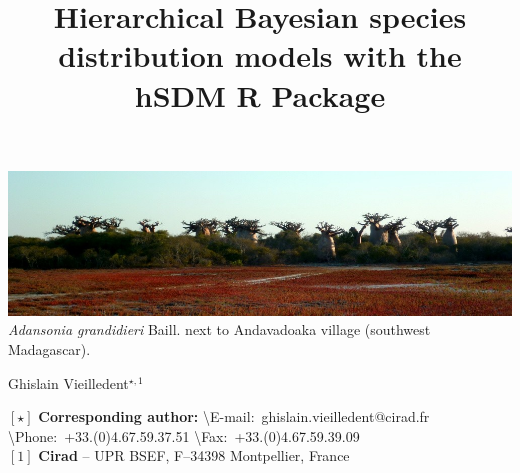 \documentclass[a4paper, 12pt, leqno]{article}\usepackage[]{graphicx}\usepackage[]{color}
\title{Hierarchical Bayesian species distribution models with the \textbf{hSDM} R Package}
\date{}
\author{}
\begin{document}
\maketitle
\vspace{-1cm}
\begin{center}
  \includegraphics[width=\textwidth]{header.jpg}\\
  \textit{Adansonia grandidieri} Baill. next to Andavadoaka village (southwest Madagascar).
\end{center}
\vspace{1cm}
\begin{center}
  \large{Ghislain Vieilledent$^{\star,1}$}
\end{center}

\vspace{0.3cm}



{\footnotesize
  \begin{flushleft}
    $[\star]$ \textbf{Corresponding author:}
    \textbackslash{E-mail}:~ghislain.vieilledent@cirad.fr
    \textbackslash{Phone}:~+33.(0)4.67.59.37.51
    \textbackslash{Fax}:~+33.(0)4.67.59.39.09\\
    $[1]$ \textbf{Cirad} -- UPR BSEF, F–34398 Montpellier, France\\
\end{flushleft}}
\end{document}
